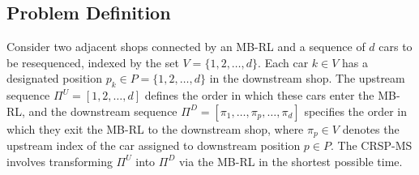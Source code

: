 \documentclass[12pt]{article}
\begin{document}
\subsection{Problem Definition}\label{sec3-1}
Consider two adjacent shops connected by an MB-RL and a sequence of $d$ cars to be resequenced, indexed by the set $V=\{1,2,\dots,d\}$. Each car $k\in V$ has a designated position $p_k\in P=\{1,2,\dots,d\}$ in the downstream shop. The upstream sequence $\Pi^U=[1,2,\dots,d]$ defines the order in which these cars enter the MB-RL, and the downstream sequence $\Pi^D=[\pi_1,\dots,\pi_p,\dots,\pi_d]$ specifies the order in which they exit the MB-RL to the downstream shop, where $\pi_p\in V$ denotes the upstream index of the car assigned to downstream position $p\in P$. The CRSP-MS involves transforming $\Pi^U$ into $\Pi^D$ via the MB-RL in the shortest possible time. %


\end{document}
